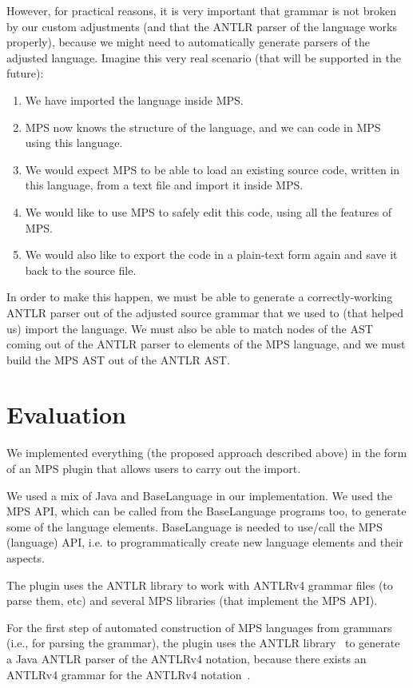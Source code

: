 \documentclass[10pt]{sigplanconf}
\begin{document}
However, for practical reasons, it is very important that grammar is not broken by our custom adjustments (and that the ANTLR parser of the language works properly), because we might need to automatically generate parsers of the adjusted language.
Imagine this very real scenario (that will be supported in the future):
\begin{enumerate}
	\item We have imported the language inside MPS.
	\item MPS now knows the structure of the language, and we can code in MPS using this language.
	\item We would expect MPS to be able to load an existing source code, written in this language, from a text file and import it inside MPS.
	\item We would like to use MPS to safely edit this code, using all the features of MPS.
	\item We would also like to export the code in a plain-text form again and save it back to the source file.
\end{enumerate}
In order to make this happen, we must be able to generate a correctly-working ANTLR parser out of the adjusted source grammar that we used to (that helped us) import the language.
We must also be able to match nodes of the AST coming out of the ANTLR parser to elements of the MPS language, and we must build the MPS AST out of the ANTLR AST.


\section{Evaluation}

We implemented everything (the proposed approach described above) in the form of an MPS plugin that allows users to carry out the import.

We used a mix of Java and BaseLanguage in our implementation.
We used the MPS API, which can be called from the BaseLanguage programs too, to generate some of the language elements.
BaseLanguage is needed to use/call the MPS (language) API, i.e. to programmatically create new language elements and their aspects.

The plugin uses the ANTLR library to work with ANTLRv4 grammar files (to parse them, etc) and several MPS libraries (that implement the MPS API).

For the first step of automated construction of MPS languages from grammars (i.e., for parsing the grammar), the plugin uses the ANTLR library~\cite{ref:ANTLR4} to generate a Java ANTLR parser of the ANTLRv4 notation, because there exists an ANTLRv4 grammar for the ANTLRv4 notation~\cite{ref:ANTLR4reference}.
\end{document}
